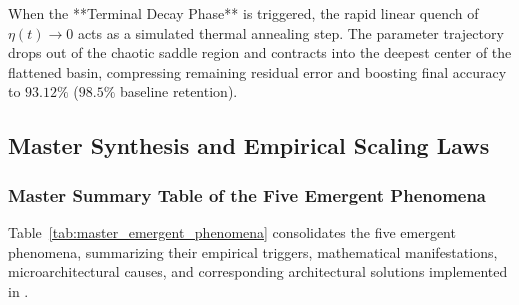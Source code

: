 When the **Terminal Decay Phase** is triggered, the rapid linear quench of $\eta(t) \to 0$ acts as a simulated thermal annealing step. The parameter trajectory drops out of the chaotic saddle region and contracts into the deepest center of the flattened basin, compressing remaining residual error and boosting final accuracy to $\mathbf{93.12\%}$ ($98.5\%$ baseline retention).

\subsection{Master Synthesis and Empirical Scaling Laws}
\label{sec:phenom_synthesis_laws}

\subsubsection{Master Summary Table of the Five Emergent Phenomena}
\label{sec:phenom_master_table}

Table~\ref{tab:master_emergent_phenomena} consolidates the five emergent phenomena, summarizing their empirical triggers, mathematical manifestations, microarchitectural causes, and corresponding architectural solutions implemented in \neuralops.

